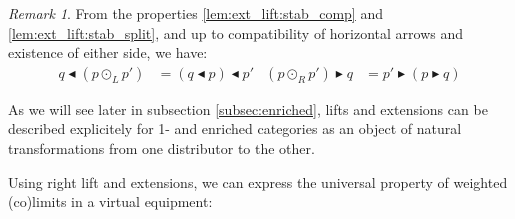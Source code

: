 \documentclass[10pt,a4paper]{article}
\newcommand{\rext}{\mathbin{\blacktriangleright}}
\newcommand{\rift}{\mathbin{\blacktriangleleft}}
\theoremstyle{plain}
\theoremstyle{definition}
\theoremstyle{remark}
\newtheorem{remark}[theorem]{Remark}
\begin{document}
\begin{remark}
    \label{rem:ext_lift:comp}
    From the properties \ref{lem:ext_lift:stab_comp} and \ref{lem:ext_lift:stab_split}, and up to compatibility of horizontal arrows and existence of either side, we have:
    \begin{align*}
        q \rift (p\odot_Lp') &= (q \rift p) \rift p' & (p\odot_Rp') \rext q &= p' \rext (p \rext q)
    \end{align*}
\end{remark}

As we will see later in subsection \ref{subsec:enriched}, lifts and extensions can be described explicitely for 1- and enriched categories as an object of natural transformations from one distributor to the other.

Using right lift and extensions, we can express the universal property of weighted (co)limits in a virtual equipment:
\end{document}
